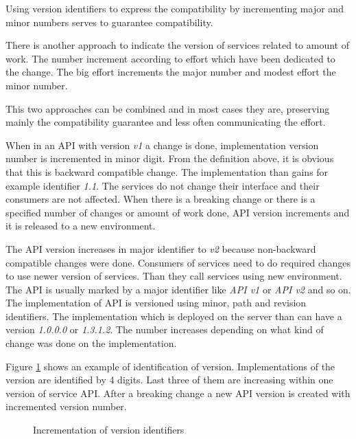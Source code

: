 Using version identifiers to express the compatibility by incrementing major and minor numbers serves to guarantee compatibility. 

There is another approach to indicate the version of services related to amount of work. The number increment according to effort which have been dedicated to the change. The big effort increments the major number and modest effort the minor number. 

This two approaches can be combined and in most cases they are, preserving mainly the compatibility guarantee and less often communicating the effort. \cite{soa-governance}

\bigskip

When in an API with version \emph{v1} a change is done, implementation version number is incremented in minor digit. From the definition above, it is obvious that this is backward compatible change. The implementation than gains for example identifier \emph{1.1}. The services do not change their interface and their consumers are not affected. 
When there is a breaking change or there is a specified number of changes or amount of work done, API version increments and it is released to a new environment. 

The API version increases in major identifier to \emph{v2} because non-backward compatible changes were done. Consumers of services need to do required changes to use newer version of services. Than they call services using new environment. 
The API is usually marked by a major identifier like \emph{API v1} or \emph{API v2} and so on.
The implementation of API is versioned using minor, path and revision identifiers. The implementation which is deployed on the server than can have a version \emph{1.0.0.0} or \emph{1.3.1.2}. The number increases depending on what kind of change was done on the implementation.

Figure \ref{fig:version-identifying} shows an example of identification of version. Implementations of the version are identified by 4 digits. Last three of them are increasing within one version of service API. After a breaking change a new API version is created with incremented version number. 

\begin{figure}[htp] 
\caption{Incrementation of version identifiers}
\label{fig:version-identifying}
\end{figure} 



